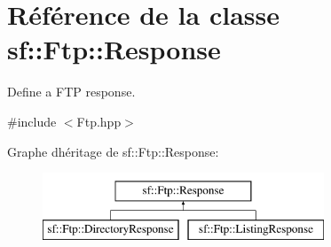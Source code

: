 \hypertarget{classsf_1_1Ftp_1_1Response}{}\section{Référence de la classe sf\+:\+:Ftp\+:\+:Response}
\label{classsf_1_1Ftp_1_1Response}


Define a F\+TP response.  




{\ttfamily \#include $<$Ftp.\+hpp$>$}

Graphe d\textquotesingle{}héritage de sf\+:\+:Ftp\+:\+:Response\+:\begin{figure}[H]
\begin{center}
\leavevmode
\includegraphics[height=2.000000cm]{classsf_1_1Ftp_1_1Response}
\end{center}
\end{figure}
